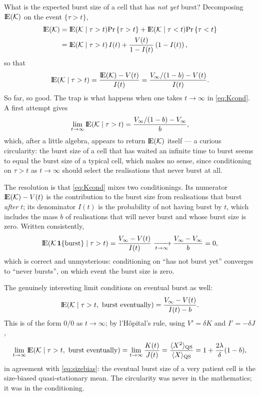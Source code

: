 What is the expected burst size of a cell that has \emph{not yet} burst?
Decomposing ${\rm I}\!{\rm E}(\mathcal{K})$ on the event $\{\tau>t\}$,
\begin{align}
{\rm I}\!{\rm E}(\mathcal{K}) &= {\rm I}\!{\rm E}(\mathcal{K}\mid \tau > t) {\text{Pr}\left\{\tau > t\right\}} + {\rm I}\!{\rm E}(\mathcal{K}\mid \tau < t){\text{Pr}\left\{\tau<t\right\}}\nonumber\\
&= {\rm I}\!{\rm E}(\mathcal{K}\mid\tau > t)\, I(t) + \frac{V(t)}{1 - I(t)} \left(1 - I(t)\right),
\end{align}
so that
\begin{equation}
{\rm I}\!{\rm E}(\mathcal{K}\mid \tau > t)  = \frac{{\rm I}\!{\rm E}(\mathcal{K}) - V(t)}{I(t)}
=\frac{V_\infty/(1-b) - V(t)}{I(t)}.
\label{eq:Kcond}
\end{equation}
So far, so good. The trap is what happens when one takes $t\to\infty$ in
\eqref{eq:Kcond}. A first attempt gives
$$
\lim_{t\to\infty}{\rm I}\!{\rm E}(\mathcal{K}\mid \tau > t)
=\frac{V_\infty/(1-b)-V_\infty}{b},
$$
which, after a little algebra, appears to return ${\rm I}\!{\rm E}(\mathcal{K})$ itself --- a
curious circularity: the burst size of a cell that has waited an infinite
time to burst seems to equal the burst size of a typical cell, which makes
no sense, since conditioning on $\tau>t$ as $t\to\infty$ should select the
realisations that never burst at all.

The resolution is that \eqref{eq:Kcond} mixes two conditionings. Its
numerator ${\rm I}\!{\rm E}(\mathcal{K})-V(t)$ is the contribution to the burst size from
realisations that burst \emph{after} $t$; its denominator $I(t)$ is the
probability of not having burst by $t$, which includes the mass $b$ of
realisations that will never burst and whose burst size is zero. Written
consistently,
\begin{equation}
{\rm I}\!{\rm E}(\mathcal{K}\,\mathbf 1\{\text{burst}\}\mid\tau>t)
=\frac{V_\infty-V(t)}{I(t)}
\xrightarrow[t\to\infty]{}\frac{V_\infty-V_\infty}{b}=0,
\end{equation}
which is correct and unmysterious: conditioning on ``has not burst yet''
converges to ``never bursts'', on which event the burst size is zero.

The genuinely interesting limit conditions on eventual burst as well:
\begin{equation}
{\rm I}\!{\rm E}(\mathcal{K}\mid \tau>t,\ \text{burst eventually})
=\frac{V_\infty-V(t)}{I(t)-b}.
\end{equation}
This is of the form $0/0$ as $t\to\infty$; by l'H\^opital's rule, using
$V'=\delta K$ and $I'=-\delta J$,
\begin{equation}
\lim_{t\to\infty}\mean{\Kb\mid \tau>t,\ \text{burst eventually}}
=\lim_{t\to\infty}\frac{K(t)}{J(t)}
=\frac{\langle X^2\rangle_{\rm QS}}{\langle X\rangle_{\rm QS}}
=1+\frac{2\lambda}{\delta}(1-b),
\label{eq:latemean}
\end{equation}
in agreement with \eqref{eq:sizebias}: the eventual burst size of a very
patient cell is the size-biased quasi-stationary mean. The circularity was
never in the mathematics; it was in the conditioning.
